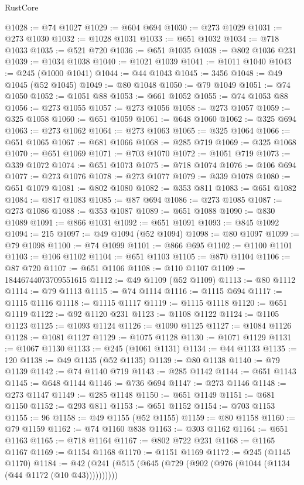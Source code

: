 \begin{lexlean}{RustCore}
\begin{coremodule}
@1028 := @74 @1027
@1029 := @604 @694
@1030 := @273 @1029
@1031 := @273 @1030
@1032 := @1028 @1031
@1033 := @651 @1032
@1034 := @718 @1033
@1035 := @521 @720
@1036 := @651 @1035
@1038 := @802 @1036 @231
@1039 := @1034 @1038
@1040 := @1021 @1039
@1041 := @1011 @1040
@1043 := @245 (@1000 @1041)
@1044 := @44 @1043
@1045 := 3456
@1048 := @49 @1045 (@52 @1045)
@1049 := @80 @1048
@1050 := @79 @1049
@1051 := @74 @1050
@1052 := @1051 @88
@1053 := @661 @1052
@1055 := @74 @1053 @88
@1056 := @273 @1055
@1057 := @273 @1056
@1058 := @273 @1057
@1059 := @325 @1058
@1060 := @651 @1059
@1061 := @648 @1060
@1062 := @325 @694
@1063 := @273 @1062
@1064 := @273 @1063
@1065 := @325 @1064
@1066 := @651 @1065
@1067 := @681 @1066
@1068 := @285 @719
@1069 := @325 @1068
@1070 := @651 @1069
@1071 := @703 @1070
@1072 := @1051 @719
@1073 := @339 @1072
@1074 := @651 @1073
@1075 := @718 @1074
@1076 := @106 @694
@1077 := @273 @1076
@1078 := @273 @1077
@1079 := @339 @1078
@1080 := @651 @1079
@1081 := @802 @1080
@1082 := @353 @811
@1083 := @651 @1082
@1084 := @817 @1083
@1085 := @87 @694
@1086 := @273 @1085
@1087 := @273 @1086
@1088 := @353 @1087
@1089 := @651 @1088
@1090 := @830 @1089
@1091 := @866 @1031
@1092 := @651 @1091
@1093 := @845 @1092
@1094 := 215
@1097 := @49 @1094 (@52 @1094)
@1098 := @80 @1097
@1099 := @79 @1098
@1100 := @74 @1099
@1101 := @866 @695
@1102 := @1100 @1101
@1103 := @106 @1102
@1104 := @651 @1103
@1105 := @870 @1104
@1106 := @87 @720
@1107 := @651 @1106
@1108 := @110 @1107
@1109 := 18446744073709551615
@1112 := @49 @1109 (@52 @1109)
@1113 := @80 @1112
@1114 := @79 @1113
@1115 := @74 @1114
@1116 := @1115 @694
@1117 := @1115 @1116
@1118 := @1115 @1117
@1119 := @1115 @1118
@1120 := @651 @1119
@1122 := @92 @1120 @231
@1123 := @1108 @1122
@1124 := @1105 @1123
@1125 := @1093 @1124
@1126 := @1090 @1125
@1127 := @1084 @1126
@1128 := @1081 @1127
@1129 := @1075 @1128
@1130 := @1071 @1129
@1131 := @1067 @1130
@1133 := @245 (@1061 @1131)
@1134 := @44 @1133
@1135 := 120
@1138 := @49 @1135 (@52 @1135)
@1139 := @80 @1138
@1140 := @79 @1139
@1142 := @74 @1140 @719
@1143 := @285 @1142
@1144 := @651 @1143
@1145 := @648 @1144
@1146 := @736 @694
@1147 := @273 @1146
@1148 := @273 @1147
@1149 := @285 @1148
@1150 := @651 @1149
@1151 := @681 @1150
@1152 := @293 @811
@1153 := @651 @1152
@1154 := @703 @1153
@1155 := 96
@1158 := @49 @1155 (@52 @1155)
@1159 := @80 @1158
@1160 := @79 @1159
@1162 := @74 @1160 @838
@1163 := @303 @1162
@1164 := @651 @1163
@1165 := @718 @1164
@1167 := @802 @722 @231
@1168 := @1165 @1167
@1169 := @1154 @1168
@1170 := @1151 @1169
@1172 := @245 (@1145 @1170)
@1184 := @42 (@241 (@515 (@645 (@729 (@902 (@976 (@1044 (@1134 (@44 @1172 (@10 @43))))))))))

\end{coremodule}
\end{lexlean}
